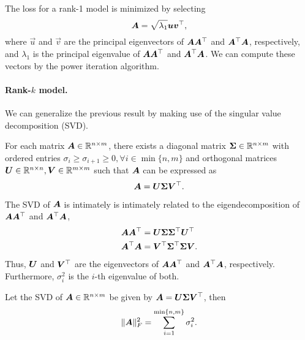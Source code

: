 \begin{important}
    The loss for a rank-1 model is minimized by selecting \[
        \bm{A} = \sqrt{\lambda_1} \bm{u} \bm{v}^\top,
    \]
    where $\vec{u}$ and $\vec{v}$ are the principal eigenvectors of $\bm{A} \bm{A}^\top$ and
    $\bm{A}^\top \bm{A}$, respectively, and $\lambda_1$ is the principal eigenvalue of
    $\bm{A} \bm{A}^\top$ and $\bm{A}^\top \bm{A}$. We can compute these vectors by
    the power iteration algorithm.
\end{important}

\paragraph{Rank-$k$ model.}

We can generalize the previous result by making use of the singular value decomposition (SVD).

\begin{theorem}
    For each matrix $\bm{A} \in \mathbb{R}^{n \times m}$, there exists a diagonal matrix $\bm{\Sigma} \in
        \mathbb{R}^{n \times m}$ with ordered entries $\sigma_i \geq \sigma_{i+1} \geq 0, \forall i \in
        \min\{ n,m \}$ and orthogonal matrices $\bm{U} \in \mathbb{R}^{n \times n}, \bm{V} \in \mathbb{R}^{m\times
            m}$ such that $\bm{A}$ can be expressed as \[
        \bm{A} = \bm{U} \bm{\Sigma} \bm{V}^\top.
    \]
\end{theorem}

The SVD of $\bm{A}$ is intimately is intimately related to the eigendecomposition of $\bm{A}
    \bm{A}^\top$ and $\bm{A}^\top \bm{A}$,
\begin{align*}
    \bm{A} \bm{A}^\top & = \bm{U} \bm{\Sigma} \bm{\Sigma}^\top \bm{U}^\top  \\
    \bm{A}^\top \bm{A} & = \bm{V}^\top \bm{\Sigma}^\top \bm{\Sigma} \bm{V}.
\end{align*}
Thus, $\bm{U}$ and $\bm{V}^\top$ are the eigenvectors of $\bm{A}\bm{A}^\top$ and $\bm{A}^\top\bm{A}$, respectively. Furthermore, $\sigma_i^2$ is the $i$-th eigenvalue of both.

\begin{lemma}
    \label{lem:svd-frob}
    Let the SVD of $\bm{A} \in \mathbb{R}^{n \times m}$ be given by $\bm{A} = \bm{U} \bm{\Sigma} \bm{V}^\top$, then \[
        \| \bm{A} \|_F^2 = \sum_{i=1}^{\min\{n,m\}} \sigma_i^2.
    \]
\end{lemma}

